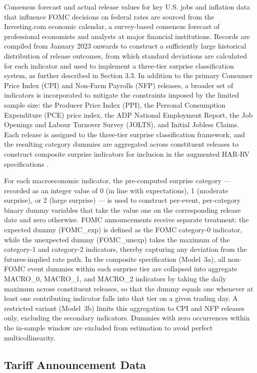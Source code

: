 \documentclass[12pt,a4paper]{report}
\begin{document}
Consensus forecast and actual release values for key U.S. jobs and inflation data that influence FOMC decisions on federal rates are sourced from the Investing.com economic calendar, a survey-based consensus forecast of professional economists and analysts at major financial institutions. Records are compiled from January 2023 onwards to construct a sufficiently large historical distribution of release outcomes, from which standard deviations are calculated for each indicator and used to implement a three-tier surprise classification system, as further described in Section 3.3. In addition to the primary Consumer Price Index (CPI) and Non-Farm Payrolls (NFP) releases, a broader set of indicators is incorporated to mitigate the constraints imposed by the limited sample size: the Producer Price Index (PPI), the Personal Consumption Expenditure (PCE) price index, the ADP National Employment Report, the Job Openings and Labour Turnover Survey (JOLTS), and Initial Jobless Claims. Each release is assigned to the three-tier surprise classification framework, and the resulting category dummies are aggregated across constituent releases to construct composite surprise indicators for inclusion in the augmented HAR-RV specifications \citep{Gilbert2017}.

For each macroeconomic indicator, the pre-computed surprise category --- recorded as an integer value of 0 (in line with expectations), 1 (moderate surprise), or 2 (large surprise) --- is used to construct per-event, per-category binary dummy variables that take the value one on the corresponding release date and zero otherwise. FOMC announcements receive separate treatment: the expected dummy (FOMC\_exp) is defined as the FOMC category-0 indicator, while the unexpected dummy (FOMC\_unexp) takes the maximum of the category-1 and category-2 indicators, thereby capturing any deviation from the futures-implied rate path. In the composite specification (Model~3a), all non-FOMC event dummies within each surprise tier are collapsed into aggregate MACRO\_0, MACRO\_1, and MACRO\_2 indicators by taking the daily maximum across constituent releases, so that the dummy equals one whenever at least one contributing indicator falls into that tier on a given trading day. A restricted variant (Model~3b) limits this aggregation to CPI and NFP releases only, excluding the secondary indicators. Dummies with zero occurrences within the in-sample window are excluded from estimation to avoid perfect multicollinearity.

\subsection{Tariff Announcement Data}
\end{document}
